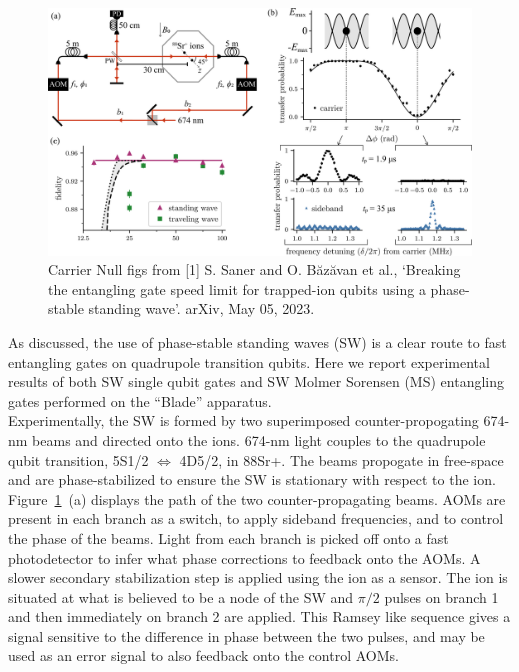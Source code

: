 \documentclass[12pt]{iopart}
\begin{document}
\begin{figure}
  \begin{center}
   \noindent\includegraphics[width=\linewidth]{figures/cnulled_figs.png}
  \end{center}
  \caption{Carrier Null figs from [1] S. Saner and O. Băzăvan et al., `Breaking the
    entangling gate speed limit for trapped-ion qubits using a
    phase-stable standing wave'. arXiv, May 05, 2023.}

  \label{fig:cnull}
\end{figure}

    As discussed, the use of phase-stable standing waves (SW) is a
    clear route to fast entangling gates on quadrupole transition
    qubits.  Here we report experimental results of both SW single
    qubit gates and SW Molmer Sorensen (MS) entangling gates performed
    on the ``Blade'' apparatus.\\

    Experimentally, the SW is formed by two superimposed
    counter-propogating 674-nm beams and directed onto the
    ions. 674-nm light couples to the quadrupole qubit transition,
    5S1/2 $\Leftrightarrow$ 4D5/2, in 88Sr+. The beams propogate in free-space and are
    phase-stabilized to ensure the SW is stationary with respect to
    the ion. Figure~\ref{fig:cnull}~(a) displays the path of the two counter-propagating
    beams. AOMs are present in each branch as a switch, to apply
    sideband frequencies, and to control the phase of the beams. Light
    from each branch is picked off onto a fast photodetector to infer
    what phase corrections to feedback onto the AOMs. A slower
    secondary stabilization step is applied using the ion as a
    sensor. The ion is situated at what is believed to be a node of
    the SW and $\pi/2$ pulses on branch 1 and then immediately on
    branch 2 are applied.  This Ramsey like sequence gives a signal
    sensitive to the difference in phase between the two pulses, and
    may be used as an error signal to also feedback onto the control
    AOMs.\\
\end{document}
